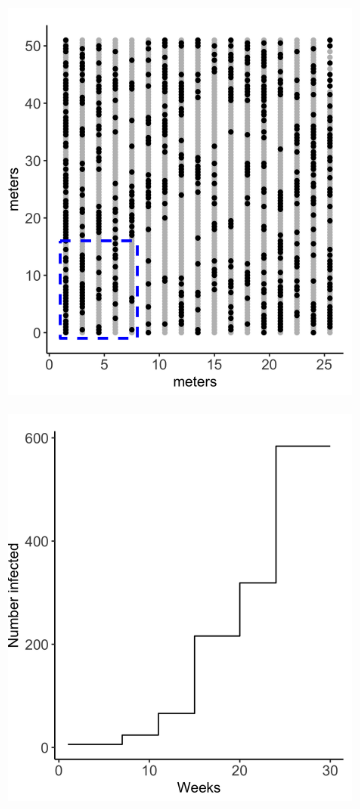 \documentclass{uwstat572}
\begin{document}
\begin{figure}[h]
	\centering
	\begin{subfigure}[b]{0.49\textwidth}
		\includegraphics[width=\textwidth]{figures/figure_1a.png}
		\caption{}
		\label{fig:plants_locations}
	\end{subfigure}
	\hfill
	\begin{subfigure}[b]{0.49\textwidth}
		\includegraphics[width=\textwidth]{figures/figure_1b.png}

\end{subfigure}
\end{figure}
\end{document}
